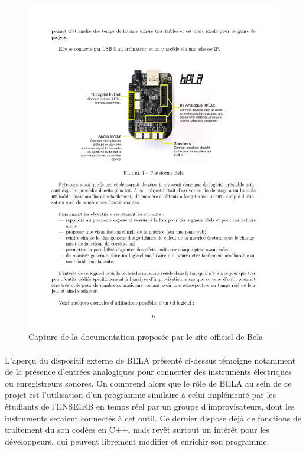 \begin{figure}[h]
    \centering
    \includegraphics[scale=0.5]{bela.png}
    \caption{Capture de la documentation proposée par le site officiel de Bela}
    \label{bela}
  \end{figure}

\paragraph{}
L'aperçu du dispositif externe de BELA présenté ci-dessus témoigne
notamment de la présence d'entrées analogiques pour connecter des
instruments électriques ou enregistreurs sonores. On comprend alors
que le rôle de BELA au sein de ce projet est l'utilisation d'un
programme similaire à celui implémenté par les étudiants de l'ENSEIRB
en temps réel par un groupe d'improvisateurs, dont les instruments
seraient connectés à cet outil. Ce dernier dispose déjà de fonctions
de traitement du son codées en C++, mais revêt surtout un intérêt pour
les développeurs, qui peuvent librement modifier et enrichir son
programme.

